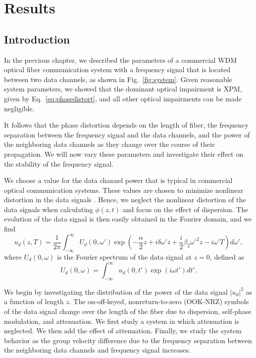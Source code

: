 \chapter{Results}
\label{chap:results}

\section{Introduction}

In the previous chapter, we described the parameters of a commercial WDM optical fiber communication system with a frequency signal that is located between two data channels, as shown in Fig.~\ref{fig:system}. Given reasonable system parameters, we showed that the dominant optical impairment is XPM, given by Eq.~\ref{eq:phasedistort}, and all other optical impairments can be made negligible.

It follows that the phase distortion depends on the length of fiber, the frequency separation between the frequency signal and the data channels, and the power of the neighboring data channels as they change over the course of their propagation. We will now vary these parameters and investigate their effect on the stability of the frequency signal.

We choose a value for the data channel power that is typical in commercial optical communication systems. These values are chosen to minimize nonlinear distortion in the data signals \cite{Agrawal2013, agrawal2012fiber}. Hence, we neglect the nonlinear distortion of the data signals when calculating $\phi(z,t)$ and focus on the effect of dispersion. The evolution of the data signal is then easily obtained in the Fourier domain, and we find
%
\begin{equation} \label{eq:datasol}
u_d(z,T) = \frac{1}{2\pi} \int_{-\infty}^{\infty} U_d(0, \omega')\exp\left(-\frac{\alpha}{2} z + i\delta\omega' z + \frac{i}{2}\beta_2\omega'^2z-i\omega' T\right) d\omega' ,
\end{equation}
%
where $U_d(0,\omega)$ is the Fourier spectrum of the data signal at $z=0$, defined as
\begin{equation}
U_d(0,\omega) = \int_{-\infty}^{\infty} u_d(0, t')\exp(i\omega t')dt'.
\end{equation}

We begin by investigating the distribution of the power of the data signal $|u_d|^2$ as a function of length $z$. The on-off-keyed, nonreturn-to-zero (OOK-NRZ) symbols of the data signal change over the length of the fiber due to dispersion, self-phase modulation, and attenuation. We first study a system in which attenuation is neglected. We then add the effect of attenuation. Finally, we study the system behavior as the group velocity difference due to the frequency separation between the neighboring data channels and frequency signal increases.

